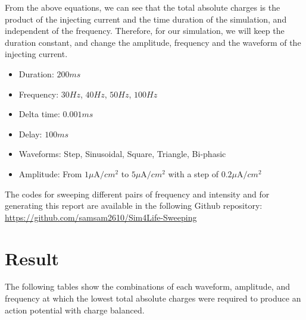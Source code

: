 \documentclass[letterpaper,12pt]{article}
\begin{document}
\noindent From the above equations, we can see that the total absolute charges is the product of the injecting current and the time duration of the simulation, and independent of the frequency. Therefore, for our simulation, we will keep the duration constant, and change the amplitude, frequency and the waveform of the injecting current.
\begin{multicols}{2}
    \begin{itemize}
        \item Duration: $200ms$
        \item Frequency: $30Hz$, $40Hz$, $50Hz$, $100Hz$
        \item Delta time: $0.001ms$
        \item Delay: $100ms$
        \item Waveforms: Step, Sinusoidal, Square, Triangle, Bi-phasic
        \item Amplitude: From $1\mu\text{A}/cm^2$ to $5\mu\text{A}/cm^2$ with a step of $0.2\mu\text{A}/cm^2$
    \end{itemize}
\end{multicols}
\noindent The codes for sweeping different pairs of frequency and intensity and for generating this report are available in the following Github repository: \url{https://github.com/samsam2610/Sim4Life-Sweeping}

\section*{Result}
\noindent The following tables show the combinations of each waveform, amplitude, and frequency at which the lowest total absolute charges were required to produce an action potential with charge balanced.
\end{document}
